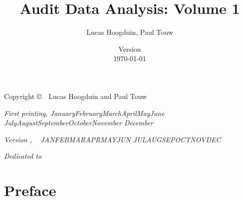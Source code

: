 \documentclass[10pt, showtrims]{memoir}
\title{Audit Data Analysis: Volume 1}
\author{Lucas Hoogduin, Paul Touw}
\date{Version \adaVersion\\\today}
\makeatletter
\theoremstyle{definition} %
\newcommand{\monthyear}{%
  \ifcase\month\or January\or February\or March\or April\or May\or June\or
  July\or August\or September\or October\or November\or
  December\fi\space\number\year
}
\def\today{%
  \two@digits{\the\day}~%
  \ifcase\month\or%
  JAN\or FEB\or MAR\or APR\or MAY\or JUN\or%
  JUL\or AUG\or SEP\or OCT\or NOV\or DEC\fi~%
  \number\year%
}
\makeatother
\begin{document}
\frontmatter

\maketitle

\cleardoublepage
\thispagestyle{empty}
\begin{center}
\vspace*{\fill}
\setlength{\parindent}{0pt}
\setlength{\parskip}{\baselineskip}
Copyright \copyright\ \the\year\ Lucas Hoogduin and Paul Touw

\textit{First printing, \monthyear}

\textit{Version \adaVersion, \today}
\vspace*{\fill}
\end{center}

\cleardoublepage
\tableofcontents

\cleardoublepage
\listoffigures

\cleardoublepage
\listoftables

\cleardoublepage
\thispagestyle{empty}
\vspace*{\fill}
\begin{center}
\DoubleSpacing
\fontsize{18}{22}\selectfont\itshape
Dedicated to
\SingleSpacing
\end{center}
\vspace*{\fill}

\cleardoublepage
\chapter*{Preface}



\mainmatter









\backmatter

\cleardoublepage
\markboth{\nomname}{\nomname}
\printnomenclature
{}

% 
% 

\cleardoublepage
{}
\printindex

\cleardoublepage
{}
\printindex[FSaudit]
\end{document}
